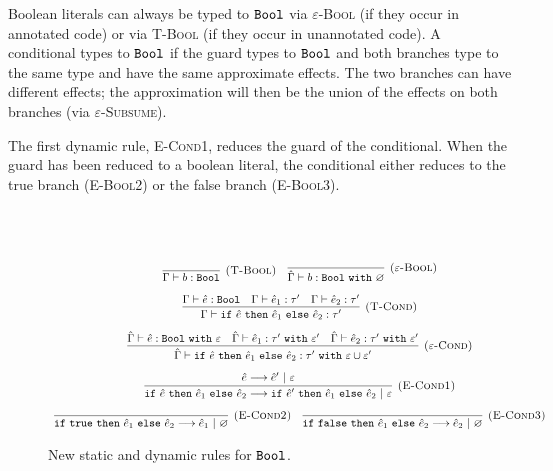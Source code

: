 Boolean literals can always be typed to $\mathtt{Bool}$ via \textsc{$\varepsilon$-Bool} (if they occur in annotated code) or via \textsc{T-Bool} (if they occur in unannotated code). A conditional types to $\mathtt{Bool}$ if the guard types to $\mathtt{Bool}$ and both branches type to the same type and have the same approximate effects. The two branches can have different effects; the approximation will then be the union of the effects on both branches (via \textsc{$\varepsilon$-Subsume}).

The first dynamic rule, \textsc{E-Cond1}, reduces the guard of the conditional. When the guard has been reduced to a boolean literal, the conditional either reduces to the true branch (\textsc{E-Bool2}) or the false branch (\textsc{E-Bool3}).

\begin{figure}[h]

 \\
 \\

\[
\begin{array}{c}

\infer[\textsc{(T-Bool)}]
	{\Gamma \vdash b: \Bool}
	{}
~~~
\infer[\textsc{($\varepsilon$-Bool)}]
	{\hat \Gamma \vdash b: \Bool~\kw{with} \varnothing}
	{}\\[2ex]

\infer[\textsc{(T-Cond)}]
	{\Gamma \vdash \cond{\hat e}{\hat e_1}{\hat e_2}: \tau'}
	{\Gamma \vdash \hat e: \Bool & \Gamma \vdash \hat e_1: \tau' & \Gamma \vdash \hat e_2: \tau'} \\[2ex]
	
\infer[\textsc{($\varepsilon$-Cond)}]
	{\hat \Gamma \vdash \cond{\hat e}{\hat e_1}{\hat e_2}: \tau'~\kw{with} \varepsilon \cup \varepsilon'}
	{\hat \Gamma \vdash \hat e: \Bool~\kw{with} \varepsilon & \hat \Gamma \vdash \hat e_1: \tau'~\kw{with} \varepsilon' & \hat \Gamma \vdash \hat e_2: \tau'~\kw{with} \varepsilon'} \\[2ex]
	
\infer[\textsc{(E-Cond1)}]
	{\cond{\hat e}{\hat e_1}{\hat e_2} \longrightarrow \cond{\hat e'}{\hat e_1}{\hat e_2}~|~\varepsilon}
	{\hat e \longrightarrow \hat e'~|~\varepsilon} \\[2ex]
	
\infer[\textsc{(E-Cond2)}]
	{\cond{\true}{\hat e_1}{\hat e_2} \longrightarrow \hat e_1~|~\varnothing}
	{}~~~
\infer[\textsc{(E-Cond3)}]
	{\cond{\false}{\hat e_1}{\hat e_2} \longrightarrow \hat e_2~|~\varnothing}
	{}

\end{array}
\]
\vspace{-12pt}
\caption{New static and dynamic rules for $\mathtt{Bool}$.}
\label{A sample. }
\end{figure}

